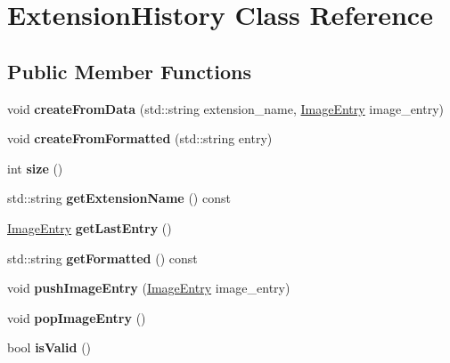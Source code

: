 \hypertarget{class_extension_history}{}\section{Extension\+History Class Reference}
\label{class_extension_history}
\subsection*{Public Member Functions}
\begin{DoxyCompactItemize}
\item 
\hypertarget{class_extension_history_a2e16c2c9a2c4d850840e1a31dfa32415}{}void {\bfseries create\+From\+Data} (std\+::string extension\+\_\+name, \hyperlink{class_image_entry}{Image\+Entry} image\+\_\+entry)\label{class_extension_history_a2e16c2c9a2c4d850840e1a31dfa32415}

\item 
\hypertarget{class_extension_history_adddd3c5f582991c7a795e554695f7ff2}{}void {\bfseries create\+From\+Formatted} (std\+::string entry)\label{class_extension_history_adddd3c5f582991c7a795e554695f7ff2}

\item 
\hypertarget{class_extension_history_a17a9b43ad449e74c3e51af3d428c6107}{}int {\bfseries size} ()\label{class_extension_history_a17a9b43ad449e74c3e51af3d428c6107}

\item 
\hypertarget{class_extension_history_a4b2a030b4b2954d22b5facdbaa8bd43e}{}std\+::string {\bfseries get\+Extension\+Name} () const \label{class_extension_history_a4b2a030b4b2954d22b5facdbaa8bd43e}

\item 
\hypertarget{class_extension_history_a688af75bd4974d708c066187191ff224}{}\hyperlink{class_image_entry}{Image\+Entry} {\bfseries get\+Last\+Entry} ()\label{class_extension_history_a688af75bd4974d708c066187191ff224}

\item 
\hypertarget{class_extension_history_abe181e3f1ac77841dabb67d609611f31}{}std\+::string {\bfseries get\+Formatted} () const \label{class_extension_history_abe181e3f1ac77841dabb67d609611f31}

\item 
\hypertarget{class_extension_history_a9164f24d4ea4bafed1d0dd9654ab2358}{}void {\bfseries push\+Image\+Entry} (\hyperlink{class_image_entry}{Image\+Entry} image\+\_\+entry)\label{class_extension_history_a9164f24d4ea4bafed1d0dd9654ab2358}

\item 
\hypertarget{class_extension_history_ac05dcfaa50dc1bd6cd082375ccdeff06}{}void {\bfseries pop\+Image\+Entry} ()\label{class_extension_history_ac05dcfaa50dc1bd6cd082375ccdeff06}

\item 
\hypertarget{class_extension_history_a6e75cb3c4d455bc534a9746f01512964}{}bool {\bfseries is\+Valid} ()\label{class_extension_history_a6e75cb3c4d455bc534a9746f01512964}

\end{DoxyCompactItemize}


